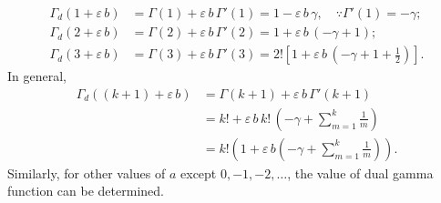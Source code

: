 \documentclass[11pt,a4paper,fleqn]{article}
\numberwithin{equation}{section}
\numberwithin{lemma}{section}
\numberwithin{theorem}{section}
\numberwithin{corollary}{section}
\begin{document}
\begin{align*}
	\Gamma_d (1 + \varepsilon \, b) & = \Gamma (1) + \varepsilon \, b \, \Gamma'(1) = 1 - \varepsilon \, b \, \gamma, \quad \because \Gamma'(1) = -\gamma;
	\\[5pt]
	\Gamma_d (2 + \varepsilon \, b) & = \Gamma (2) + \varepsilon \, b \, \Gamma'(2) = 1 + \varepsilon \, b \, (-\gamma + 1);
	\\[5pt]
	\Gamma_d (3 + \varepsilon \, b) & = \Gamma (3) + \varepsilon \, b \, \Gamma'(3) = 2 !\left[1 + \varepsilon \, b \, \left(-\gamma + 1 + \frac{1}{2}\right)\right].
\end{align*}
In general,
\begin{align*}
	\Gamma_d ((k + 1) + \varepsilon \, b) & = \Gamma (k + 1) + \varepsilon \, b \, \Gamma'(k + 1) \nonumber\\
	& = k ! + \varepsilon \, b \, k ! \, \left(-\gamma  + \sum_{m = 1}^{k}\frac{1}{m}\right) \nonumber\\
	& = k ! \left(1 + \varepsilon \, b \left(-\gamma + \sum_{m = 1}^{k}\frac{1}{m}\right)\right).
\end{align*}
Similarly, for other values of $a$ except $0, -1, -2, \dots$, the value of dual gamma function can be determined. 
\end{document}
